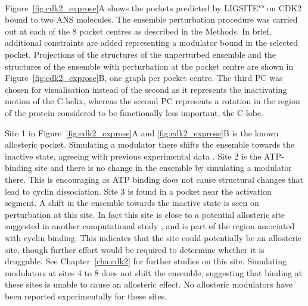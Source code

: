 Figure~\ref{fig:cdk2_exprose}A shows the pockets predicted by LIGSITE\textsuperscript{\it cs} \cite{Huang2006} on CDK2 bound to two ANS molecules.
The ensemble perturbation procedure was carried out at each of the 8 pocket centres as described in the Methods.
In brief, additional constraints are added representing a modulator bound in the selected pocket.
Projections of the structures of the unperturbed ensemble and the structures of the ensemble with perturbation at the pocket centre are shown in Figure~\ref{fig:cdk2_exprose}B, one graph per pocket centre.
The third PC was chosen for visualisation instead of the second as it represents the inactivating motion of the \textalpha C-helix, whereas the second PC represents a rotation in the region of the protein considered to be functionally less important, the C-lobe.

Site 1 in Figure~\ref{fig:cdk2_exprose}A and \ref{fig:cdk2_exprose}B is the known allosteric pocket.
Simulating a modulator there shifts the ensemble towards the inactive state, agreeing with previous experimental data \cite{Betzi2011}.
Site 2 is the ATP-binding site and there is no change in the ensemble by simulating a modulator there.
This is encouraging as ATP binding does not cause structural changes that lead to cyclin dissociation.
Site 3 is found in a pocket near the activation segment.
A shift in the ensemble towards the inactive state is seen on perturbation at this site.
In fact this site is close to a potential allosteric site suggested in another computational study \cite{Pitt2014}, and is part of the region associated with cyclin binding.
This indicates that the site could potentially be an allosteric site, though further effort would be required to determine whether it is druggable.
See Chapter~\ref{cha:cdk2} for further studies on this site.
Simulating modulators at sites 4 to 8 does not shift the ensemble, suggesting that binding at these sites is unable to cause an allosteric effect.
No allosteric modulators have been reported experimentally for these sites.


